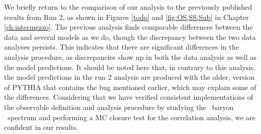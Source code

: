   We briefly return to the comparison of our analysis to the previously published results from Run 2, as shown in Figures \ref{todo} and \ref{fig:OS,SS,Sub} in Chapter \ref{ch:intermezzo}. The previous analysis finds comparable differences between the data and several models as we do, though the discrepancy between the two data analyses persists. This indicates that there are significant differences in the analysis procedure, as discrepancies show up in both the data analysis as well as the model predictions. It should be noted here that, in contrary to this analysis, the model predictions in the run 2 analysis are produced with the older, version of PYTHIA that contains the bug mentioned earlier, which may explain some of the differences. Considering that we have verified consistent implementations of the observable definition and analysis procedure by studying the \Xi\ baryon \pt\ spectrum and performing a MC closure test for the correlation analysis, we are confident in our results.  


